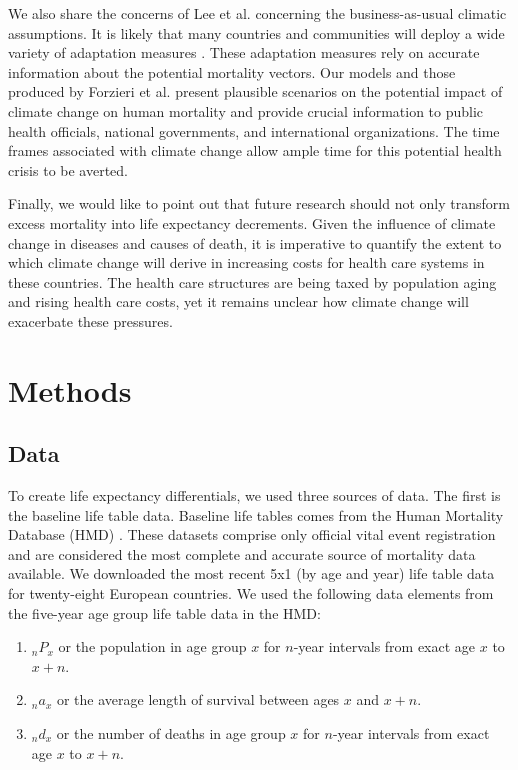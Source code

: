 \documentclass[12pt,]{article}
\begin{document}
We also share the concerns of Lee et al. \citep{lee2017comprehensive}
concerning the business-as-usual climatic assumptions. It is likely that
many countries and communities will deploy a wide variety of adaptation
measures \citep{haines2006climate, kovats2003methods, ebi2006approach}.
These adaptation measures rely on accurate information about the
potential mortality vectors. Our models and those produced by Forzieri
et al. \citep{forzieri2017increasing} present plausible scenarios on the
potential impact of climate change on human mortality and provide
crucial information to public health officials, national governments,
and international organizations. The time frames associated with climate
change allow ample time for this potential health crisis to be averted.

Finally, we would like to point out that future research should not only
transform excess mortality into life expectancy decrements. Given the
influence of climate change in diseases and causes of death, it is
imperative to quantify the extent to which climate change will derive in
increasing costs for health care systems in these countries. The health
care structures are being taxed by population aging
\citep{rechel2009can} and rising health care costs, yet it remains
unclear how climate change will exacerbate these pressures.

\newpage

\section{Methods}\label{methods-1}

\subsection{Data}\label{data}

To create life expectancy differentials, we used three sources of data.
The first is the baseline life table data. Baseline life tables comes
from the Human Mortality Database (HMD) \citep{HMD}. These datasets
comprise only official vital event registration and are considered the
most complete and accurate source of mortality data available. We
downloaded the most recent 5x1 (by age and year) life table data for
twenty-eight European countries. We used the following data elements
from the five-year age group life table data in the HMD:

\begin{enumerate}
\item $_nP_x$ or the population in age group $x$ for $n$-year intervals from exact age $x$ to $x+n$.
\item $_na_x$ or the average length of survival between ages $x$ and $x+n$.
\item $_nd_x$ or the number of deaths in age group $x$ for $n$-year intervals from exact age $x$ to $x+n$.
\end{enumerate}
\end{document}
